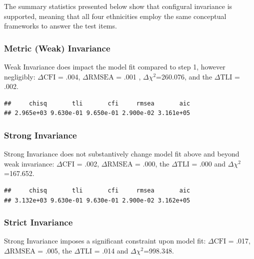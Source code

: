 \documentclass{article}\usepackage[]{graphicx}\usepackage[]{color}
\makeatletter
\newenvironment{kframe}{%
 \def\at@end@of@kframe{}%
 \ifinner\ifhmode%
  \def\at@end@of@kframe{\end{minipage}}%
  \begin{minipage}{\columnwidth}%
 \fi\fi%
 \def\FrameCommand##1{\hskip\@totalleftmargin \hskip-\fboxsep
 \colorbox{shadecolor}{##1}\hskip-\fboxsep
     \hskip-\linewidth \hskip-\@totalleftmargin \hskip\columnwidth}%
 \MakeFramed {\advance\hsize-\width
   \@totalleftmargin\z@ \linewidth\hsize
   \@setminipage}}%
 {\par\unskip\endMakeFramed%
 \at@end@of@kframe}
\newenvironment{knitrout}{}{} %
\makeatother
\begin{document}
The summary statistics presented below show that configural invariance is supported, meaning that all four ethnicities employ the same conceptual frameworks to answer the test items. 

\subsubsection*{Metric (Weak) Invariance}
Weak Invariance does impact the model fit compared to step 1, however negligibly: $\Delta\mathrm{CFI}$ = .004, $\Delta\mathrm{RMSEA}$ = .001 , $\Delta$$\chi^2$=260.076, and the $\Delta\mathrm{TLI}$ = .002.

\begin{knitrout}
\color{fgcolor}\begin{kframe}
\begin{verbatim}
##     chisq       tli       cfi     rmsea       aic 
## 2.965e+03 9.630e-01 9.650e-01 2.900e-02 3.161e+05
\end{verbatim}
\end{kframe}
\end{knitrout}


\subsubsection*{Strong Invariance}
Strong Invariance does not substantively change model fit above and beyond weak invariance: $\Delta\mathrm{CFI}$ = .002, $\Delta\mathrm{RMSEA}$ = .000, the $\Delta\mathrm{TLI}$ = .000 and $\Delta$$\chi^2$=167.652. 

\begin{knitrout}
\color{fgcolor}\begin{kframe}
\begin{verbatim}
##     chisq       tli       cfi     rmsea       aic 
## 3.132e+03 9.630e-01 9.630e-01 2.900e-02 3.162e+05
\end{verbatim}
\end{kframe}
\end{knitrout}


\subsubsection*{Strict Invariance}
Strong Invariance imposes a significant constraint upon model fit: $\Delta\mathrm{CFI}$ = .017, $\Delta\mathrm{RMSEA}$ = .005, the $\Delta\mathrm{TLI}$ = .014 and $\Delta$$\chi^2$=998.348. 
\end{document}
